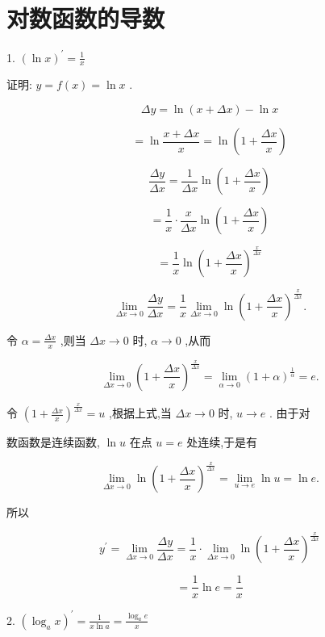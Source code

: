 \documentclass[lang=cn,newtx,10pt,scheme=chinese]{elegantbook}
\begin{document}
\section{对数函数的导数}

1. \({\left( \ln x\right) }^{\prime } = \frac{1}{x}\)

证明: \(y = f\left( x\right) = \ln x\) .

\[
{\Delta y} = \ln \left( {x + {\Delta x}}\right) - \ln x
\]

\[
= \ln \frac{x + {\Delta x}}{x} = \ln \left( {1 + \frac{\Delta x}{x}}\right)
\]

\[
\frac{\Delta y}{\Delta x} = \frac{1}{\Delta x}\ln \left( {1 + \frac{\Delta x}{x}}\right)
\]

\[
= \frac{1}{x} \cdot \frac{x}{\Delta x}\ln \left( {1 + \frac{\Delta x}{x}}\right)
\]

\[
= \frac{1}{x}\ln {\left( 1 + \frac{\Delta x}{x}\right) }^{\frac{x}{\Delta x}}
\]

\[
\mathop{\lim }\limits_{{{\Delta x} \rightarrow 0}}\frac{\Delta y}{\Delta x} = \frac{1}{x}\mathop{\lim }\limits_{{{\Delta x} \rightarrow 0}}\ln {\left( 1 + \frac{\Delta x}{x}\right) }^{\frac{x}{\Delta x}}.
\]

令 \(\alpha = \frac{\Delta x}{x}\) ,则当 \({\Delta x} \rightarrow 0\) 时, \(\alpha \rightarrow 0\) ,从而

\[
\mathop{\lim }\limits_{{{\Delta x} \rightarrow 0}}{\left( 1 + \frac{\Delta x}{x}\right) }^{\frac{x}{\Delta x}} = \mathop{\lim }\limits_{{\alpha \rightarrow 0}}{\left( 1 + \alpha \right) }^{\frac{1}{\alpha }} = e.
\]

令 \({\left( 1 + \frac{\Delta x}{x}\right) }^{\frac{x}{\Delta x}} = u\) ,根据上式,当 \({\Delta x} \rightarrow 0\) 时, \(u \rightarrow e\) . 由于对

数函数是连续函数, \(\ln u\) 在点 \(u = e\) 处连续,于是有

\[
\mathop{\lim }\limits_{{{\Delta x} \rightarrow 0}}\ln {\left( 1 + \frac{\Delta x}{x}\right) }^{\frac{x}{\Delta x}} = \mathop{\lim }\limits_{{u \rightarrow e}}\ln u = \ln e.
\]

所以

\[
{y}^{\prime } = \mathop{\lim }\limits_{{{\Delta x} \rightarrow 0}}\frac{\Delta y}{\Delta x} = \frac{1}{x} \cdot \mathop{\lim }\limits_{{{\Delta x} \rightarrow 0}}\ln {\left( 1 + \frac{\Delta x}{x}\right) }^{\frac{x}{\Delta x}}
\]

\[
= \frac{1}{x}\ln e = \frac{1}{x}
\]

2. \({\left( {\log }_{a}x\right) }^{\prime } = \frac{1}{x\ln a} = \frac{{\log }_{a}e}{x}\)
\end{document}
